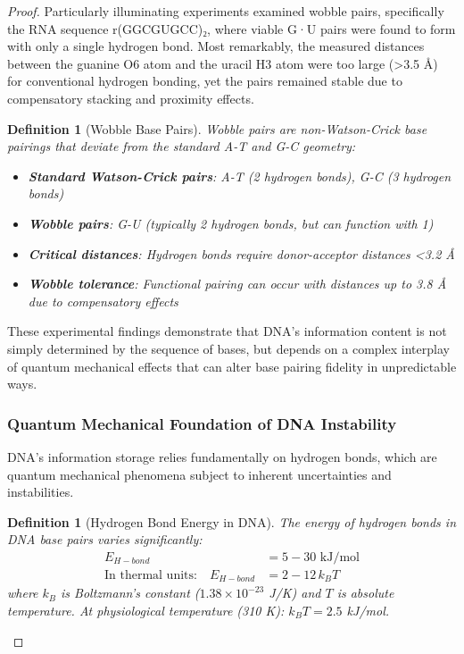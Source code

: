 \documentclass[12pt,a4paper]{article}
\newtheorem{definition}[theorem]{Definition}
\begin{document}
\begin{proof}
Particularly illuminating experiments examined wobble pairs, specifically the RNA sequence r(GGCGUGCC)₂, where viable G·U pairs were found to form with only a single hydrogen bond. Most remarkably, the measured distances between the guanine O6 atom and the uracil H3 atom were too large (>3.5 Å) for conventional hydrogen bonding, yet the pairs remained stable due to compensatory stacking and proximity effects.

\begin{definition}[Wobble Base Pairs]
Wobble pairs are non-Watson-Crick base pairings that deviate from the standard A-T and G-C geometry:
\begin{itemize}
\item \textbf{Standard Watson-Crick pairs}: A-T (2 hydrogen bonds), G-C (3 hydrogen bonds)
\item \textbf{Wobble pairs}: G-U (typically 2 hydrogen bonds, but can function with 1)
\item \textbf{Critical distances}: Hydrogen bonds require donor-acceptor distances <3.2 Å
\item \textbf{Wobble tolerance}: Functional pairing can occur with distances up to 3.8 Å due to compensatory effects
\end{itemize}
\end{definition}

These experimental findings demonstrate that DNA's information content is not simply determined by the sequence of bases, but depends on a complex interplay of quantum mechanical effects that can alter base pairing fidelity in unpredictable ways.

\subsubsection{Quantum Mechanical Foundation of DNA Instability}

DNA's information storage relies fundamentally on hydrogen bonds, which are quantum mechanical phenomena subject to inherent uncertainties and instabilities.

\begin{definition}[Hydrogen Bond Energy in DNA]
The energy of hydrogen bonds in DNA base pairs varies significantly:
\begin{align}
E_{H-bond} &= 5-30 \text{ kJ/mol} \\
\text{In thermal units:} \quad E_{H-bond} &= 2-12 \, k_BT
\end{align}
where $k_B$ is Boltzmann's constant ($1.38 \times 10^{-23}$ J/K) and $T$ is absolute temperature.
At physiological temperature (310 K): $k_BT = 2.5$ kJ/mol.
\end{definition}


\end{proof}
\end{document}
